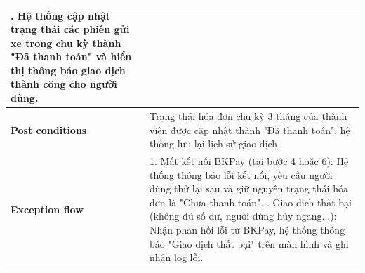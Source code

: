 \begin{longtable}{|>{\centering\arraybackslash}m{3cm}|m{13.7cm}|}
7. Hệ thống cập nhật trạng thái các phiên gửi xe trong chu kỳ thành "Đã thanh toán" và hiển thị thông báo giao dịch thành công cho người dùng. \\ \hline
\textbf{Post conditions} & Trạng thái hóa đơn chu kỳ 3 tháng của thành viên được cập nhật thành "Đã thanh toán", hệ thống lưu lại lịch sử giao dịch. \\ \hline
\textbf{Exception flow} & 
1. Mất kết nối BKPay (tại bước 4 hoặc 6): Hệ thống thông báo lỗi kết nối, yêu cầu người dùng thử lại sau và giữ nguyên trạng thái hóa đơn là "Chưa thanh toán". \newline
2. Giao dịch thất bại (không đủ số dư, người dùng hủy ngang...): Nhận phản hồi lỗi từ BKPay, hệ thống thông báo "Giao dịch thất bại" trên màn hình và ghi nhận log lỗi. \\ \hline
\end{longtable}
\endgroup

